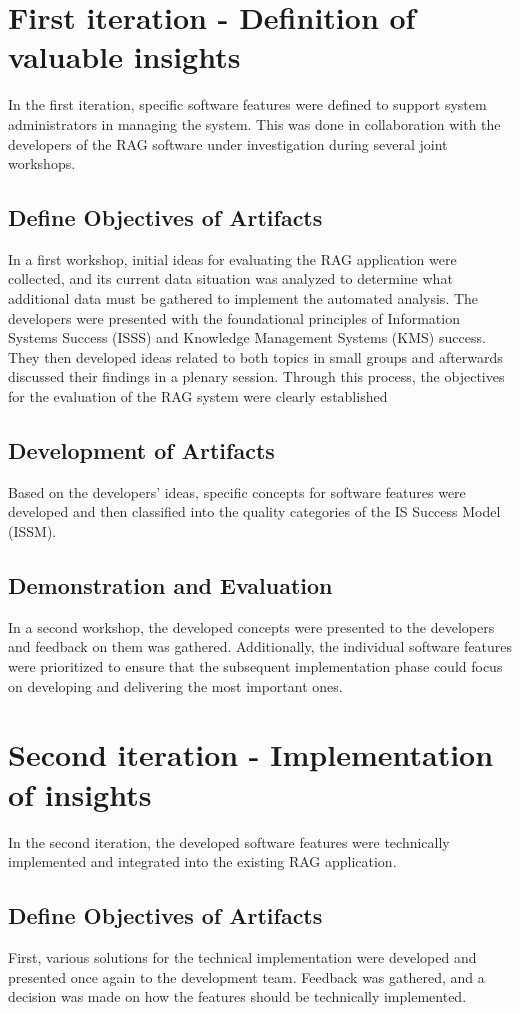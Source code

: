 \documentclass[
	english,
	ruledheaders=section,%
	class=report,%
	thesis={type=bachelor},%
	accentcolor=1b,%
	custommargins=true,%
	marginpar=false,%
	parskip=half-,%
	fontsize=11pt,%
	DIV=14,
]{tudapub}
\begin{document}
\section{First iteration - Definition of valuable insights}
In the first iteration, specific software features were defined to support system administrators in managing the system. This was done in collaboration with the developers of the RAG software under investigation during several joint workshops.
\subsection{Define Objectives of Artifacts}
In a first workshop, initial ideas for evaluating the RAG application were collected, and its current data situation was analyzed to determine what additional data must be gathered to implement the automated analysis. The developers were presented with the foundational principles of Information Systems Success (ISSS) and Knowledge Management Systems (KMS) success. They then developed ideas related to both topics in small groups and afterwards discussed their findings in a plenary session. Through this process, the objectives for the evaluation of the RAG system were clearly established
\subsection{Development of Artifacts}
Based on the developers' ideas, specific concepts for software features were developed and then classified into the quality categories of the IS Success Model (ISSM).
\subsection{Demonstration and Evaluation}
In a second workshop, the developed concepts were presented to the developers and feedback on them was gathered. Additionally, the individual software features were prioritized to ensure that the subsequent implementation phase could focus on developing and delivering the most important ones.
\section{Second iteration - Implementation of insights}
In the second iteration, the developed software features were technically implemented and integrated into the existing RAG application.
\subsection{Define Objectives of Artifacts}
First, various solutions for the technical implementation were developed and presented once again to the development team. Feedback was gathered, and a decision was made on how the features should be technically implemented.
\end{document}
